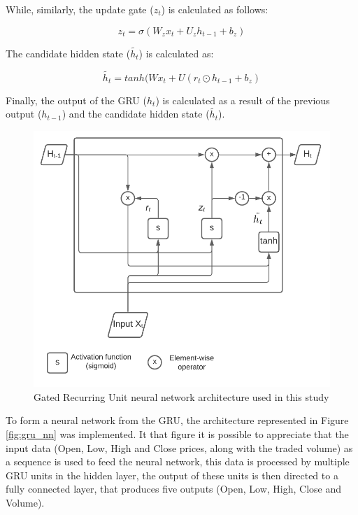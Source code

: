 \documentclass[10pt,twocolumn,letterpaper]{article}
\begin{document}
While, similarly, the update gate ($z_t$) is calculated as follows:

\begin{equation}
	z_t = \sigma (W_z x_t + U_z h_{t-1} + b_z) 
\end{equation}

The candidate hidden state ($\tilde{h_t}$) is calculated as:

\begin{equation}
	\tilde{h_t} = tanh(W x_t + U (r_t \odot h_{t-1} + b_z) 
\end{equation}

Finally, the output of the GRU ($h_t$) is calculated as a result of the previous output ($h_{t-1}$) and the candidate hidden state ($\tilde{h_t}$).

\begin{figure}[h]
	\begin{center}
		\includegraphics[width=1.0\linewidth]{GRU.pdf}
	\end{center}
	\caption{Gated Recurring Unit neural network architecture used in this study}
	\label{fig:gru}
\end{figure}

To form a neural network from the GRU, the architecture represented in Figure \ref{fig:gru_nn} was implemented. It that figure it is possible to appreciate that the input data (Open, Low, High and Close prices, along with the traded volume) as a sequence is used to feed the neural network, this data is processed by multiple GRU units in the hidden layer, the output of these units is then directed to a fully connected layer, that produces five outputs (Open, Low, High, Close and Volume).
\end{document}
